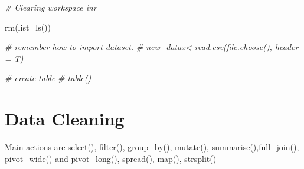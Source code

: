 \documentclass[
]{book}
\newenvironment{Shaded}{\begin{snugshade}}{\end{snugshade}}
\newcommand{\AttributeTok}[1]{\textcolor[rgb]{0.77,0.63,0.00}{#1}}
\newcommand{\CommentTok}[1]{\textcolor[rgb]{0.56,0.35,0.01}{\textit{#1}}}
\newcommand{\FunctionTok}[1]{\textcolor[rgb]{0.00,0.00,0.00}{#1}}
\newcommand{\NormalTok}[1]{#1}
\begin{document}
\begin{Shaded}
\begin{Highlighting}[]
\CommentTok{\# Clearing workspace inr}

\FunctionTok{rm}\NormalTok{(}\AttributeTok{list=}\FunctionTok{ls}\NormalTok{())}

\CommentTok{\# remember how to import dataset.}
\CommentTok{\# new\_datax\textless{}{-}read.csv(file.choose(), header = T)}

\CommentTok{\# create table}
\CommentTok{\# table()}
\end{Highlighting}
\end{Shaded}

\hypertarget{data-cleaning}{%
\chapter{Data Cleaning}\label{data-cleaning}}

Main actions are select(), filter(), group\_by(), mutate(), summarise(),full\_join(), pivot\_wide() and pivot\_long(), spread(), map(), strsplit()
\end{document}
